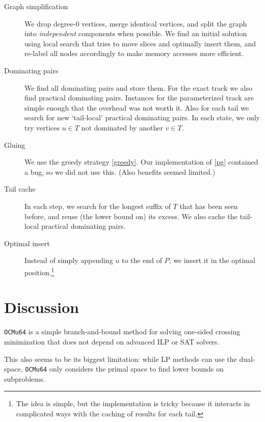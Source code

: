 \documentclass[a4paper,UKenglish,cleveref, autoref, thm-restate]{lipics-v2021}
\begin{document}
\begin{description}
  \item[Graph simplification] We drop degree-$0$ vertices, merge identical
    vertices, and split the graph into \emph{independent} components when
    possible. We find an initial solution using local search that tries to move
    slices and optimally insert them, and re-label all nodes accordingly to make
    memory accesses more efficient.
  \item[Dominating pairs] We find all dominating pairs and store them. For the
    exact track we also find practical dominating pairs. Instances for the parameterized
    track are simple enough that the overhead was not worth it. Also for each
    tail we search for new `tail-local' practical dominating pairs. In each state, we only
    try vertices $u\in T$ not dominated by another $v\in T$.
  \item[Gluing] We use the greedy strategy \cref{greedy}. Our implementation
    of \cref{pg} contained a bug, so we did not use this. (Also benefits
    seemed limited.)
  \item[Tail cache] In each step, we search for the longest suffix of $T$ that
    has been seen before, and reuse (the lower bound on) its excess. We also
    cache the tail-local practical dominating pairs.
  \item[Optimal insert] Instead of simply appending $u$ to the end of $P$, we
    insert it in the optimal position.\footnote{The idea is simple, but the
    implementation is tricky because it interacts in complicated ways with
    the caching of results for each tail.}
\end{description}

\section{Discussion}
\texttt{OCMu64} is a simple branch-and-bound method for solving one-sided
crossing minimization that does not depend on advanced ILP or SAT solvers.

This also seems to be its biggest limitation: while LP methods can use
the dual-space, \texttt{OCMu64} only considers the primal space to find lower
bounds on subproblems.
\end{document}
